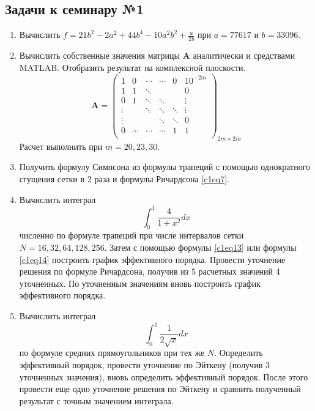 \subsection{Задачи к семинару №1}
\begin{enumerate}
\item Вычислить $\displaystyle f = 21b^2 - 2a^2 + 44b^4 - 10a^2b^2 + \frac{a}{2b}$ при $a = 77617$ и $b = 33096$.
\item Вычислить собственные значения матрицы $\mathbf{A}$ аналитически и средствами MATLAB. Отобразить результат на комплексной плоскости.
\begin{equation} \nonumber
	\mathbf{A} = 
	\begin{pmatrix}
		1 & 0 & \cdots & \cdots & 0 & 10^{-2m} \\
		1 & 1 & \ddots &  &  & 0 \\
		0 & 1 & \ddots &  \ddots &  & \vdots \\
		\vdots &  & \ddots & \ddots & \ddots & \vdots \\
		\vdots &  &  & \ddots & \ddots  & 0 \\
		0 & \cdots & \cdots &  \cdots & 1 & 1 \\
	\end{pmatrix}_{2m \times 2m}
\end{equation}
Расчет выполнить при $m = 20,23,30$.
\item Получить формулу Симпсона из формулы трапеций с помощью однократного сгущения сетки в 2 раза и формулы Ричардсона \eqref{c1eq7}.
\item Вычислить интеграл 
\begin{equation} \nonumber
	\int_{0}^{1} \frac{4}{1 + x^2} dx
\end{equation}
численно по формуле трапеций при числе интервалов сетки $N = 16,32,64,128,256$. Затем с помощью формулы \eqref{c1eq13} или формулы \eqref{c1eq14} построить график эффективного порядка. Провести уточнение решения по формуле Ричардсона, получив из 5 расчетных значений 4 уточненных. По уточненным значениям вновь построить график эффективного порядка.
\item Вычислить интеграл 
\begin{equation} \nonumber
	\int_{0}^{1} \frac{1}{2 \sqrt{x}} dx
\end{equation}
по формуле средних прямоугольников при тех же $N$. Определить эффективный порядок, провести уточнение по Эйткену (получив 3 уточненных значения), вновь определить эффективный порядок. После этого провести еще одно уточнение решения по Эйткену и сравнить полученный результат с точным значением интеграла.
\end {enumerate}